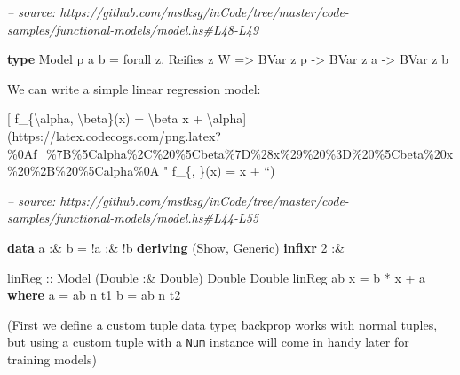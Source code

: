 \documentclass[]{article}
\newenvironment{Shaded}{}{}
\newcommand{\CommentTok}[1]{\textcolor[rgb]{0.38,0.63,0.69}{\textit{#1}}}
\newcommand{\DataTypeTok}[1]{\textcolor[rgb]{0.56,0.13,0.00}{#1}}
\newcommand{\DecValTok}[1]{\textcolor[rgb]{0.25,0.63,0.44}{#1}}
\newcommand{\FunctionTok}[1]{\textcolor[rgb]{0.02,0.16,0.49}{#1}}
\newcommand{\KeywordTok}[1]{\textcolor[rgb]{0.00,0.44,0.13}{\textbf{#1}}}
\newcommand{\NormalTok}[1]{#1}
\newcommand{\OtherTok}[1]{\textcolor[rgb]{0.00,0.44,0.13}{#1}}
\begin{document}
\begin{Shaded}
\begin{Highlighting}[]
\CommentTok{-- source: https://github.com/mstksg/inCode/tree/master/code-samples/functional-models/model.hs#L48-L49}

\KeywordTok{type} \DataTypeTok{Model}\NormalTok{ p a b }\FunctionTok{=}\NormalTok{ forall z}\FunctionTok{.} \DataTypeTok{Reifies}\NormalTok{ z }\DataTypeTok{W}
                \OtherTok{=>} \DataTypeTok{BVar}\NormalTok{ z p }\OtherTok{->} \DataTypeTok{BVar}\NormalTok{ z a }\OtherTok{->} \DataTypeTok{BVar}\NormalTok{ z b}
\end{Highlighting}
\end{Shaded}

We can write a simple linear regression model:

{[} f\_\{\textbackslash{}alpha, \textbackslash{}beta\}(x) = \textbackslash{}beta
x +
\textbackslash{}alpha{]}(https://latex.codecogs.com/png.latex?\%0Af\_\%7B\%5Calpha\%2C\%20\%5Cbeta\%7D\%28x\%29\%20\%3D\%20\%5Cbeta\%20x\%20\%2B\%20\%5Calpha\%0A
" f\_\{\alpha, \beta\}(x) = \beta x + \alpha ``)

\begin{Shaded}
\begin{Highlighting}[]
\CommentTok{-- source: https://github.com/mstksg/inCode/tree/master/code-samples/functional-models/model.hs#L44-L55}

\KeywordTok{data}\NormalTok{ a }\FunctionTok{:&}\NormalTok{ b }\FunctionTok{=} \FunctionTok{!}\NormalTok{a }\FunctionTok{:&} \FunctionTok{!}\NormalTok{b}
  \KeywordTok{deriving}\NormalTok{ (}\DataTypeTok{Show}\NormalTok{, }\DataTypeTok{Generic}\NormalTok{)}
\KeywordTok{infixr} \DecValTok{2} \FunctionTok{:&}

\OtherTok{linReg ::} \DataTypeTok{Model}\NormalTok{ (}\DataTypeTok{Double} \FunctionTok{:&} \DataTypeTok{Double}\NormalTok{) }\DataTypeTok{Double} \DataTypeTok{Double}
\NormalTok{linReg ab x }\FunctionTok{=}\NormalTok{ b }\FunctionTok{*}\NormalTok{ x }\FunctionTok{+}\NormalTok{ a}
  \KeywordTok{where}
\NormalTok{    a }\FunctionTok{=}\NormalTok{ ab }\FunctionTok{^^.}\NormalTok{ t1}
\NormalTok{    b }\FunctionTok{=}\NormalTok{ ab }\FunctionTok{^^.}\NormalTok{ t2}
\end{Highlighting}
\end{Shaded}

(First we define a custom tuple data type; backprop works with normal tuples,
but using a custom tuple with a \texttt{Num} instance will come in handy later
for training models)
\end{document}
